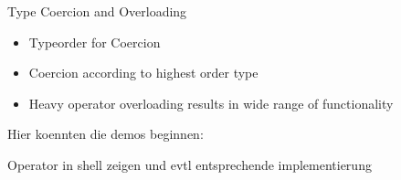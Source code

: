 \documentclass{beamer}
\begin{document}
\begin{frame}[fragile]
  \vspace{0.5cm}
    Type Coercion and Overloading

    \begin{itemize}
        \item Typeorder for Coercion
        \item Coercion according to highest order type
        \item Heavy operator overloading results in wide range of functionality

    \end{itemize}

    Hier koennten die demos beginnen: 

    Operator in shell zeigen und evtl entsprechende implementierung
%

\end{frame}
\end{document}
